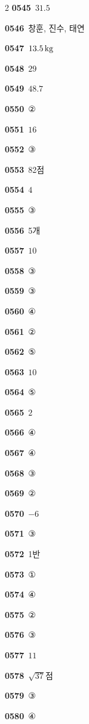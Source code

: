 \documentclass[10pt,a4paper]{article}
\begin{document}
\begin{multicols}{2}
\noindent\textbf{0545}\ $31.5$\par
\noindent\textbf{0546}\ 창훈, 진수, 태연\par
\noindent\textbf{0547}\ $13.5\mkern3mu \mathrm{kg}$\par
\noindent\textbf{0548}\ $29$\par
\noindent\textbf{0549}\ $48.7$\par
\noindent\textbf{0550}\ ②\par
\noindent\textbf{0551}\ $16$\par
\noindent\textbf{0552}\ ③\par
\noindent\textbf{0553}\ 82점\par
\noindent\textbf{0554}\ $4$\par
\noindent\textbf{0555}\ ③\par
\noindent\textbf{0556}\ 5개\par
\noindent\textbf{0557}\ $10$\par
\noindent\textbf{0558}\ ③\par
\noindent\textbf{0559}\ ③\par
\noindent\textbf{0560}\ ④\par
\noindent\textbf{0561}\ ②\par
\noindent\textbf{0562}\ ⑤\par
\noindent\textbf{0563}\ $10$\par
\noindent\textbf{0564}\ ⑤\par
\noindent\textbf{0565}\ $2$\par
\noindent\textbf{0566}\ ④\par
\noindent\textbf{0567}\ ④\par
\noindent\textbf{0568}\ ③\par
\noindent\textbf{0569}\ ②\par
\noindent\textbf{0570}\ $-6$\par
\noindent\textbf{0571}\ ③\par
\noindent\textbf{0572}\ 1반\par
\noindent\textbf{0573}\ ①\par
\noindent\textbf{0574}\ ④\par
\noindent\textbf{0575}\ ②\par
\noindent\textbf{0576}\ ③\par
\noindent\textbf{0577}\ $11$\par
\noindent\textbf{0578}\ $\sqrt{37}$점\par
\noindent\textbf{0579}\ ③\par
\noindent\textbf{0580}\ ④\par

\end{multicols}
\end{document}
